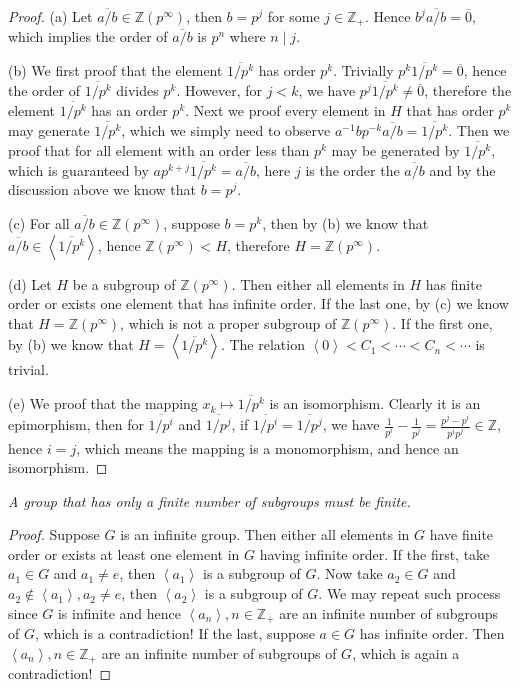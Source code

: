 \begin{proof}
(a) Let $\overline{a/b}\in\mathbb{Z}(p^\infty)$, then $b=p^j$ for some $j\in\mathbb{Z}_+$. Hence $b^j\overline{a/b}=\overline{0}$, which implies the order of $\overline{a/b}$ is $p^n$ where $n\mid j$.\par
(b) We first proof that the element $\overline{1/p^k}$ has order $p^k$. Trivially $p^k\overline{1/p^k}=\overline{0}$, hence the order of $\overline{1/p^k}$ divides $p^k$. However, for $j<k$, we have $p^j\overline{1/p^k}\ne\overline{0}$, therefore the element $\overline{1/p^k}$ has an order $p^k$. Next we proof every element in $H$ that has order $p^k$ may generate $\overline{1/p^k}$, which we simply need to observe $a^{-1}bp^{-k}\overline{a/b}=\overline{1/p^k}$. Then we proof that for all element with an order less than $p^k$ may be generated by $\overline{1/p^k}$, which is guaranteed by $ap^{k+j}\overline{1/p^k}=\overline{a/b}$, here $j$ is the order the $\overline{a/b}$ and by the discussion above we know that $b=p^j$.\par
(c) For all $\overline{a/b}\in\mathbb{Z}(p^\infty)$, suppose $b=p^k$, then by (b) we know that $\overline{a/b}\in\left<\overline{1/p^k}\right>$, hence $\mathbb{Z}(p^\infty)<H$, therefore $H=\mathbb{Z}(p^\infty)$.\par
(d) Let $H$ be a subgroup of $\mathbb{Z}(p^\infty)$. Then either all elements in $H$ has finite order or exists one element that has infinite order. If the last one, by (c) we know that $H=\mathbb{Z}(p^\infty)$, which is not a proper subgroup of $\mathbb{Z}(p^\infty)$. If the first one, by (b) we know that $H=\left<\overline{1/p^k}\right>$. The relation $\left<0\right><C_1<\cdots<C_n<\cdots$ is trivial.\par
(e) We proof that the mapping $x_k\mapsto\overline{1/p^k}$ is an isomorphism. Clearly it is an epimorphism, then for $\overline{1/p^i}$ and $\overline{1/p^j}$, if $\overline{1/p^i}=\overline{1/p^j}$, we have $\frac{1}{p^i}-\frac{1}{p^j}=\frac{p^j-p^i}{p^ip^j}\in\mathbb{Z}$, hence $i=j$, which means the mapping is a monomorphism, and hence an isomorphism.
\end{proof}
\begin{problem}\em
A group that has only a finite number of subgroups must be finite.
\end{problem}
\begin{proof}
Suppose $G$ is an infinite group. Then either all elements in $G$ have finite order or exists at least one element in $G$ having infinite order. If the first, take $a_1\in G$ and $a_1\ne e$, then $\left<a_1\right>$ is a subgroup of $G$. Now take $a_2\in G$ and $a_2\notin\left<a_1\right>,a_2\ne e$, then $\left<a_2\right>$ is a subgroup of $G$. We may repeat such process since $G$ is infinite and hence $\left<a_n\right>,n\in\mathbb{Z}_+$ are an infinite number of subgroups of $G$, which is a contradiction! If the last, suppose $a\in G$ has infinite order. Then $\left<a_n\right>,n\in\mathbb{Z}_+$ are an infinite number of subgroups of $G$, which is again a contradiction!
\end{proof}
